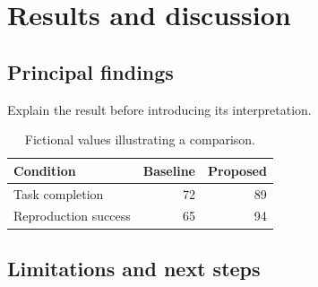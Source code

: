 \chapter{Results and discussion}
\section{Principal findings}
Explain the result before introducing its interpretation.
\begin{table}[ht]\centering\begin{tabular}{lrr}\toprule Condition & Baseline & Proposed\\\midrule Task completion & 72 & 89\\Reproduction success & 65 & 94\\\bottomrule\end{tabular}\caption{Fictional values illustrating a comparison.}\end{table}
\section{Limitations and next steps}\lipsum[5-6]
